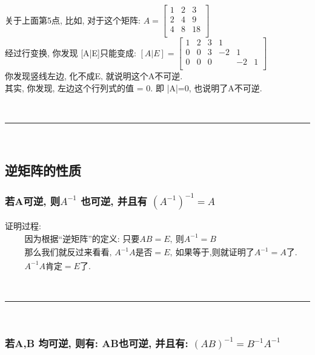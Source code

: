 \documentclass[UTF8]{ctexart}
\begin{document}
	
	\begin{myEnvSample}
关于上面第5点, 比如, 对于这个矩阵: 
	$A=\left[ \begin{matrix}
		1&		2&		3\\
		2&		4&		9\\
		4&		8&		18\\
	\end{matrix} \right]$\\
	经过行变换, 你发现 [A|E]只能变成:
	$[A|E]=\left[ \begin{array}{ccc|ccc}
		1&		2&		3&		1&		&		\\
		0&		0&		3&		-2&		1&		\\
		0&		0&		0&		&		-2&		1\\
	\end{array} \right]$\\
	
你发现竖线左边, 化不成E, 就说明这个A不可逆. \\
其实, 你发现, 左边这个行列式的值 = 0. 即 |A|=0, 也说明了A不可逆.
	\end{myEnvSample}

~\\
\hrule
~\\


\subsection{逆矩阵的性质}


\subsubsection{若A可逆, 则$A^{-1}$ 也可逆, 并且有 $\left( A^{-1} \right) ^{-1}=A$ }

证明过程: 
\begin{align*}
		& \text{因为根据}\text{逆矩阵}\text{的定义:\ 只要}AB=E,\ \text{则}A^{-1}=B\\
	& \text{那么我们就反过来看看,\ }A^{-1}A\text{是否}=E,\ \text{如果等于,则就证明了}A^{-1}=A\text{了}.\\
	& A^{-1}A\text{肯定}=E\text{了}.
\end{align*}

~\\
\hrule
~\\

\subsubsection{若A,B 均可逆, 则有: AB也可逆, 并且有: $\left( AB \right) ^{-1}=B^{-1}A^{-1}$}
\end{document}
